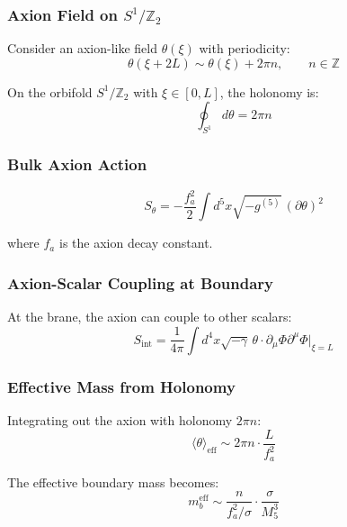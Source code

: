 \documentclass[11pt,a4paper]{article}
\newcommand{\Mfive}{M_5}
\newcommand{\mb}{m_b}
\theoremstyle{definition}
\theoremstyle{plain}
\theoremstyle{remark}
\begin{document}
\subsubsection{Axion Field on $S^1/\mathbb{Z}_2$}

Consider an axion-like field $\theta(\xi)$ with periodicity:
\begin{equation}
\theta(\xi + 2L) \sim \theta(\xi) + 2\pi n, \qquad n \in \mathbb{Z}
\label{eq:axion-period}
\end{equation}

On the orbifold $S^1/\mathbb{Z}_2$ with $\xi \in [0, L]$, the holonomy is:
\begin{equation}
\oint_{S^1} d\theta = 2\pi n
\label{eq:holonomy}
\end{equation}

\subsubsection{Bulk Axion Action}

\begin{equation}
S_{\theta} = -\frac{f_a^2}{2} \int d^5x \sqrt{-g^{(5)}} \, (\partial\theta)^2
\label{eq:S-axion}
\end{equation}

where $f_a$ is the axion decay constant.

\subsubsection{Axion-Scalar Coupling at Boundary}

At the brane, the axion can couple to other scalars:
\begin{equation}
S_{\mathrm{int}} = \frac{1}{4\pi} \int d^4x \sqrt{-\gamma} \, \theta \cdot \partial_\mu\Phi \partial^\mu\Phi \big|_{\xi=L}
\label{eq:axion-coupling}
\end{equation}

\subsubsection{Effective Mass from Holonomy}

Integrating out the axion with holonomy $2\pi n$:
\begin{equation}
\langle \theta \rangle_{\mathrm{eff}} \sim 2\pi n \cdot \frac{L}{f_a^2}
\label{eq:theta-eff}
\end{equation}

The effective boundary mass becomes:
\begin{equation}
\mb^{\mathrm{eff}} \sim \frac{n}{f_a^2/\sigma} \cdot \frac{\sigma}{\Mfive^3}
\label{eq:mb-axion}
\end{equation}
\end{document}
